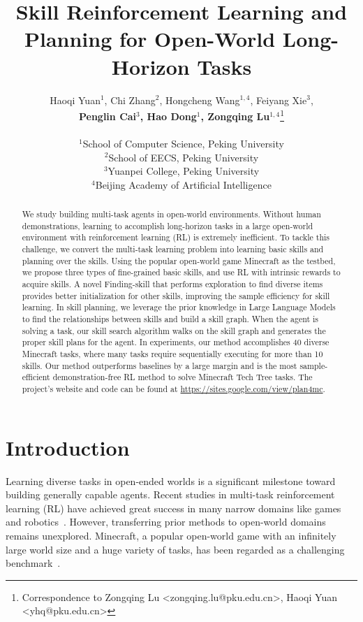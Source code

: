 \documentclass{article}
\title{Skill Reinforcement Learning and Planning for Open-World Long-Horizon Tasks}
\author{%
  Haoqi Yuan$^1$, Chi Zhang$^2$, Hongcheng Wang$^{1,4}$, Feiyang Xie$^3$, \\
  \textbf{Penglin Cai$^3$, Hao Dong$^{1}$, Zongqing Lu$^{1,4}$}\thanks{Correspondence to Zongqing Lu <zongqing.lu@pku.edu.cn>, Haoqi Yuan <yhq@pku.edu.cn>} \\  \\
   $^1$School of Computer Science, Peking University \\
   $^2$School of EECS, Peking University \\
   $^3$Yuanpei College, Peking University \\
   $^4$Beijing Academy of Artificial Intelligence
}
\begin{document}
\maketitle


\begin{abstract}
We study building multi-task agents in open-world environments. Without human demonstrations, learning to accomplish long-horizon tasks in a large open-world environment with reinforcement learning (RL) is extremely inefficient. To tackle this challenge, we convert the multi-task learning problem into learning basic skills and planning over the skills. Using the popular open-world game Minecraft as the testbed, we propose three types of fine-grained basic skills, and use RL with intrinsic rewards to acquire skills. A novel Finding-skill that performs exploration to find diverse items provides better initialization for other skills, improving the sample efficiency for skill learning. In skill planning, we leverage the prior knowledge in Large Language Models to find the relationships between skills and build a skill graph. When the agent is solving a task, our skill search algorithm walks on the skill graph and generates the proper skill plans for the agent. In experiments, our method accomplishes 40 diverse Minecraft tasks, where many tasks require sequentially executing for more than 10 skills. Our method outperforms baselines by a large margin and is the most sample-efficient demonstration-free RL method to solve Minecraft Tech Tree tasks. The project's website and code can be found at \href{https://sites.google.com/view/plan4mc}{https://sites.google.com/view/plan4mc}.
\end{abstract}

\section{Introduction}
Learning diverse tasks in open-ended worlds is a significant milestone toward building generally capable agents. 
Recent studies in multi-task reinforcement learning (RL) have achieved great success in many narrow domains like games~\citep{muzero} and robotics~\citep{meta-world}. 
However, transferring prior methods to open-world domains~\citep{open-ended-learning,minedojo} remains unexplored. Minecraft, a popular open-world game with an infinitely large world size and a huge variety of tasks, has been regarded as a challenging benchmark~\citep{minerl,minedojo}. 
\end{document}
